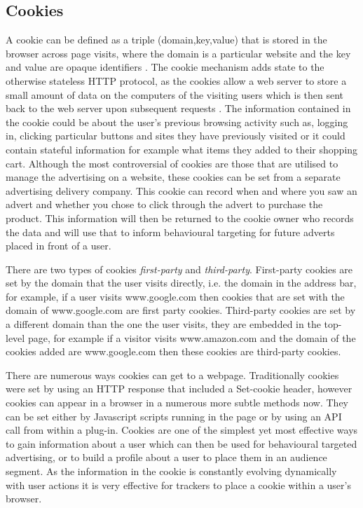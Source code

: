\documentclass{article}
\begin{document}
\subsection {Cookies} \label{cookies}
A cookie can be defined as a triple (domain,key,value) that is stored in the browser across page visits, where the domain is a particular website and the key and value are opaque identifiers \parencite{roesner}. The cookie mechanism adds state to the otherwise stateless HTTP protocol, as the cookies allow a web server to store a small amount of data on the computers of the visiting users which is then sent back to the web server upon subsequent requests \parencite{cookielessMonster}. The information contained in the cookie could be about the user's previous browsing activity such as, logging in, clicking particular buttons and sites they have previously visited or it could contain stateful information for example what items they added to their shopping cart. Although the most controversial of cookies are those that are utilised to manage the advertising on a website, these cookies can be set from a separate advertising delivery company. This cookie can record when and where you saw an advert and whether you chose to click through the advert to purchase the product. This information will then be returned to the cookie owner who records the data and will use that to inform behavioural targeting for future adverts placed in front of a user.  \newline 

There are two types of cookies \textit{first-party} and \textit{third-party}. First-party cookies are set by the domain that the user visits directly, i.e. the domain in the address bar, for example, if a user visits www.google.com then cookies that are set with the domain of www.google.com are first party cookies. Third-party cookies are set by a different domain than the one the user visits, they are embedded in the top-level page, for example if a visitor visits www.amazon.com and the domain of the cookies added are www.google.com then these cookies are third-party cookies. \newline

There are numerous ways cookies can get to a webpage. Traditionally cookies were set by using an HTTP response that included a Set-cookie header, however cookies can appear in a browser in a numerous more subtle methods now. They can be set either by Javascript scripts running in the page or by using an API call from within a plug-in. Cookies are one of the simplest yet most effective ways to gain information about a user which can then be used for behavioural targeted advertising, or to build a profile about a user to place them in an audience segment. As the information in the cookie is constantly evolving dynamically with user actions it is very effective for trackers to place a cookie within a user's browser. 
\end{document}
